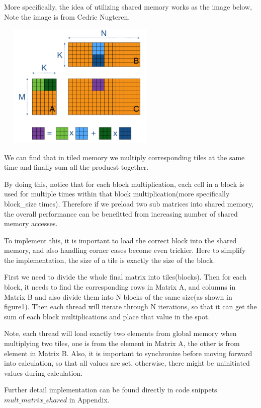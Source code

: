 \documentclass{cs4444}
\begin{document}
		More specifically, the idea of utilizing shared memory works as the image below, Note the image is from Cedric Nugteren.
		\begin{center}
					\includegraphics[width=8cm, height=6cm]{gemm2a}
		\end{center}
		We can find that in tiled memory we multiply corresponding tiles at the same time and finally sum all the producst together. 
		
		By doing this, notice that for each block multiplication, each cell in a block is used for multiple times within that block multiplication(more specifically block\_size times). Therefore if we preload two sub matrices into shared memory, the overall performance can be benefitted from increasing number of shared memory accesses.
		
		To implement this, it is important to load the correct block into the shared memory, and also handling corner cases become even trickier. Here to simplify the implementation,  the size of a tile is exactly the size of the block. 
		
		First we need to divide the whole final matrix into tiles(blocks). Then for each block, it needs to find the corresponding rows in Matrix A, and columns in Matrix B and also divide them into N blocks of the same size(as shown in figure1). Then each thread will iterate through N iterations, so that it can get the sum of each block multiplications and place that value in the spot. 
		
		Note, each thread will load exactly two elements from global memory when multiplying two tiles, one is from the element in Matrix A, the other is from element in Matrix B. 
		Also, it is important to synchronize before moving forward into calculation, so that all values are set, otherwise, there might be uninitiated values during calculation.
		
		Further detail implementation can be found directly in code snippets $mult\_matrix\_shared$ in Appendix.
		
\end{document}
